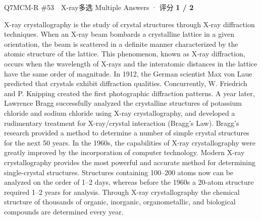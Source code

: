 \begin{qblock}{Q7\quad MCM-R \#53\ \ X-ray}{多选 Multiple Answers · 评分 \textcolor{cAccent}{\bfseries 1 / 2}}
\begin{promptbox}
X-ray crystallography is the study of crystal structures through X-ray diffraction techniques. When an X-ray beam bombards a crystalline lattice in a given orientation, the beam is scattered in a definite manner characterized by the atomic structure of the lattice. This phenomenon, known as X-ray diffraction, occurs when the wavelength of X-rays and the interatomic distances in the lattice have the same order of magnitude. In 1912, the German scientist Max von Laue predicted that crystals exhibit diffraction qualities. Concurrently, W. Friedrich and P. Knipping created the first photographic diffraction patterns. A year later, Lawrence Bragg successfully analyzed the crystalline structures of potassium chloride and sodium chloride using X-ray crystallography, and developed a rudimentary treatment for X-ray/crystal interaction (Bragg's Law). Bragg's research provided a method to determine a number of simple crystal structures for the next 50 years. In the 1960s, the capabilities of X-ray crystallography were greatly improved by the incorporation of computer technology. Modern X-ray crystallography provides the most powerful and accurate method for determining single-crystal structures. Structures containing 100--200 atoms now can be analyzed on the order of 1--2 days, whereas before the 1960s a 20-atom structure required 1--2 years for analysis. Through X-ray crystallography the chemical structure of thousands of organic, inorganic, organometallic, and biological compounds are determined every year.
\end{promptbox}

\end{qblock}
